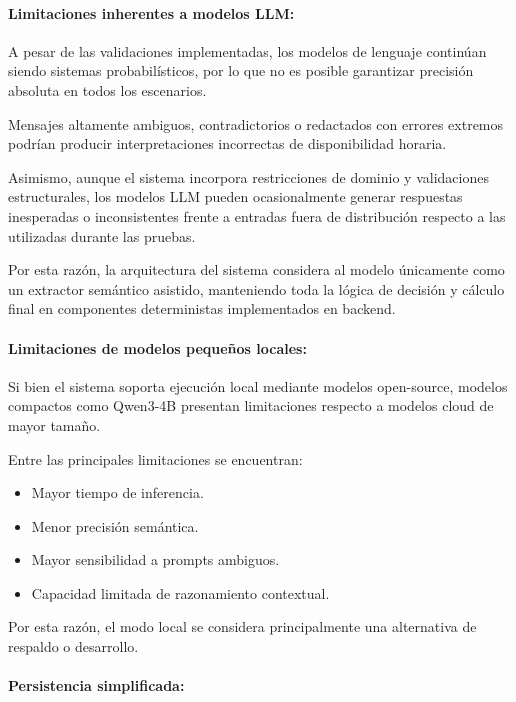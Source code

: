 \paragraph{Limitaciones inherentes a modelos LLM:}

A pesar de las validaciones implementadas, los modelos de lenguaje continúan siendo sistemas probabilísticos, por lo que no es posible garantizar precisión absoluta en todos los escenarios.

Mensajes altamente ambiguos, contradictorios o redactados con errores extremos podrían producir interpretaciones incorrectas de disponibilidad horaria.

Asimismo, aunque el sistema incorpora restricciones de dominio y validaciones estructurales, los modelos LLM pueden ocasionalmente generar respuestas inesperadas o inconsistentes frente a entradas fuera de distribución respecto a las utilizadas durante las pruebas.

Por esta razón, la arquitectura del sistema considera al modelo únicamente como un extractor semántico asistido, manteniendo toda la lógica de decisión y cálculo final en componentes deterministas implementados en backend.

\paragraph{Limitaciones de modelos pequeños locales:}

Si bien el sistema soporta ejecución local mediante modelos open-source, modelos compactos como Qwen3-4B presentan limitaciones respecto a modelos cloud de mayor tamaño.

Entre las principales limitaciones se encuentran:

\begin{itemize}
    \item Mayor tiempo de inferencia.
    \item Menor precisión semántica.
    \item Mayor sensibilidad a prompts ambiguos.
    \item Capacidad limitada de razonamiento contextual.
\end{itemize}

Por esta razón, el modo local se considera principalmente una alternativa de respaldo o desarrollo.

\paragraph{Persistencia simplificada:}

